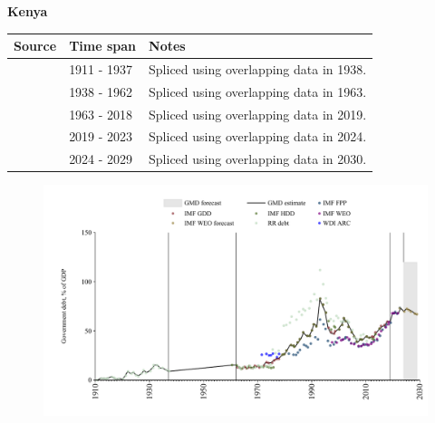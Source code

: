 \documentclass[12pt,a4paper,landscape]{article}
\begin{document}
\begin{adjustbox}{max totalsize={\paperwidth}{\paperheight},center}
\begin{minipage}[t][\textheight][t]{\textwidth}
\vspace*{0.5cm}
{}
\begin{center}
{\Large\bfseries Kenya}
\end{center}
\vspace{0.5cm}
\begin{table}[H]
\centering
\small
\begin{tabular}{|l|l|l|}
\hline
\textbf{Source} & \textbf{Time span} & \textbf{Notes} \\
\hline
\rowcolor{white}\cite{RR_debt}& 1911 - 1937 &Spliced using overlapping data in 1938.\\
\rowcolor{lightgray}\cite{IMF_HDD}& 1938 - 1962 &Spliced using overlapping data in 1963.\\
\rowcolor{white}\cite{IMF_GDD}& 1963 - 2018 &Spliced using overlapping data in 2019.\\
\rowcolor{lightgray}\cite{IMF_FPP}& 2019 - 2023 &Spliced using overlapping data in 2024.\\
\rowcolor{white}\cite{IMF_WEO_forecast}& 2024 - 2029 &Spliced using overlapping data in 2030.\\
\hline
\end{tabular}
\end{table}
\begin{figure}[H]
\centering
\includegraphics[width=\textwidth,height=0.6\textheight,keepaspectratio]{graphs/KEN_govdebt_GDP.pdf}
\end{figure}
\end{minipage}
\end{adjustbox}
\end{document}
